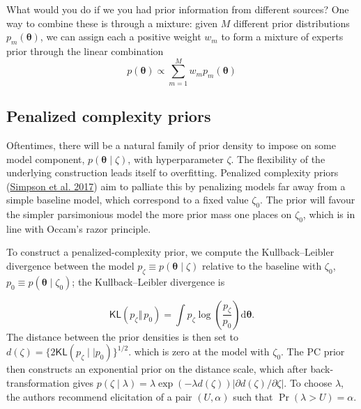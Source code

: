 \documentclass[
  11pt,
  letterpaper,
]{scrbook}
\theoremstyle{definition}
\theoremstyle{definition}
\theoremstyle{definition}
\theoremstyle{plain}
\theoremstyle{remark}
\begin{document}
What would you do if we you had prior information from different
sources? One way to combine these is through a mixture: given \(M\)
different prior distributions \(p_m(\boldsymbol{\theta})\), we can
assign each a positive weight \(w_m\) to form a mixture of experts prior
through the linear combination
\[ p(\boldsymbol{\theta}) \propto \sum_{m=1}^M w_m p_m(\boldsymbol{\theta})\]

\hypertarget{penalized-complexity-priors}{%
\subsection{Penalized complexity
priors}\label{penalized-complexity-priors}}

Oftentimes, there will be a natural family of prior density to impose on
some model component, \(p(\boldsymbol{\theta} \mid \zeta)\), with
hyperparameter \(\zeta\). The flexibility of the underlying construction
leads itself to overfitting. Penalized complexity priors
(\protect\hyperlink{ref-Simpson:2017}{Simpson et al. 2017}) aim to
palliate this by penalizing models far away from a simple baseline
model, which correspond to a fixed value \(\zeta_0\). The prior will
favour the simpler parsimonious model the more prior mass one places on
\(\zeta_0\), which is in line with Occam's razor principle.

To construct a penalized-complexity prior, we compute the
Kullback--Leibler divergence between the model
\(p_\zeta \equiv p(\boldsymbol{\theta} \mid \zeta)\) relative to the
baseline with \(\zeta_0\),
\(p_0 \equiv p(\boldsymbol{\theta} \mid \zeta_0)\); the
Kullback--Leibler divergence is

\[
\mathsf{KL}(p_\zeta \Vert\, p_0)=\int p_\zeta \log\left(\frac{p_\zeta}{p_0}\right) \mathrm{d} \boldsymbol{\theta}.
\] The distance between the prior densities is then set to
\(d(\zeta) = \{2\mathsf{KL}(p_\zeta \mid\mid p_0)\}^{1/2}\). which is
zero at the model with \(\zeta_0\). The PC prior then constructs an
exponential prior on the distance scale, which after back-transformation
gives
\(p(\zeta \mid \lambda) = \lambda\exp(-\lambda d(\zeta)) \left| {\partial d(\zeta)}/{\partial \zeta}\right|\).
To choose \(\lambda\), the authors recommend elicitation of a pair
\((U, \alpha)\) such that \(\Pr(\lambda > U)=\alpha\).
\end{document}
